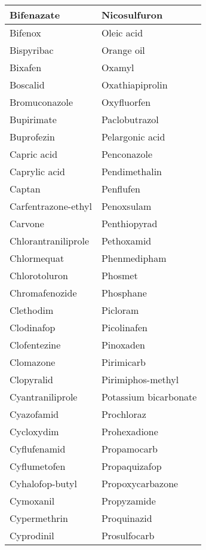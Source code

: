 \begin{small}
\begin{longtable}{|l|l|}
        Bifenazate & Nicosulfuron \\ \hline
        Bifenox & Oleic acid \\ \hline
        Bispyribac & Orange oil \\ \hline
        Bixafen & Oxamyl \\ \hline
        Boscalid & Oxathiapiprolin \\ \hline
        Bromuconazole & Oxyfluorfen \\ \hline
        Bupirimate & Paclobutrazol \\ \hline
        Buprofezin & Pelargonic acid \\ \hline
        Capric acid & Penconazole \\ \hline
        Caprylic acid & Pendimethalin \\ \hline
        Captan & Penflufen \\ \hline
        Carfentrazone-ethyl & Penoxsulam \\ \hline
        Carvone & Penthiopyrad \\ \hline
        Chlorantraniliprole & Pethoxamid \\ \hline
        Chlormequat & Phenmedipham \\ \hline
        Chlorotoluron & Phosmet \\ \hline
        Chromafenozide & Phosphane \\ \hline
        Clethodim & Picloram \\ \hline
        Clodinafop & Picolinafen \\ \hline
        Clofentezine & Pinoxaden \\ \hline
        Clomazone & Pirimicarb \\ \hline
        Clopyralid & Pirimiphos-methyl \\ \hline
        Cyantraniliprole & Potassium bicarbonate \\ \hline
        Cyazofamid & Prochloraz \\ \hline
        Cycloxydim & Prohexadione \\ \hline
        Cyflufenamid & Propamocarb \\ \hline
        Cyflumetofen & Propaquizafop \\ \hline
        Cyhalofop-butyl & Propoxycarbazone \\ \hline
        Cymoxanil & Propyzamide \\ \hline
        Cypermethrin & Proquinazid \\ \hline
        Cyprodinil & Prosulfocarb \\ \hline

\end{longtable}
\end{small}
